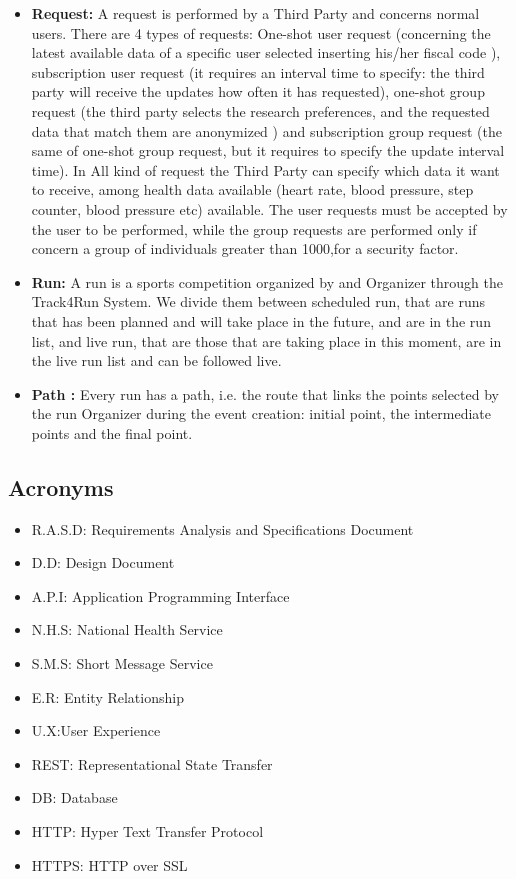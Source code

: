 \begin{itemize}
\item\textbf{Request:} A request is performed by a Third Party and concerns normal users. There are 4 types of requests: One-shot user request (concerning the latest available data of a specific user selected inserting his/her fiscal code ), subscription user request (it requires an interval time to specify: the third party will receive the updates how often it has requested), one-shot group request (the third party selects the research preferences, and the requested data that match them are anonymized ) and subscription group request (the same of one-shot group request, but it requires to specify the update interval time). In All kind of request the Third Party can specify which data it want to receive, among health data available (heart rate, blood pressure, step counter, blood pressure etc) available. The user requests must be accepted by the user to be performed, while the group requests are performed only if concern a group of individuals greater than 1000,for a security factor.

\item\textbf{Run:} A run is a sports competition organized by and Organizer through  the Track4Run System. We divide them between scheduled run, that are runs that has been planned and will take place in the future, and are in the run list, and live run, that are those that are taking place in this moment, are in the live run list and can be followed live. 
\item\textbf{Path :} Every run has a path, i.e. the route that links the points selected by the run Organizer during the event creation: initial point, the intermediate points and the final point. 



	\end{itemize}
\subsection{Acronyms}

\begin{itemize}
  \item R.A.S.D: Requirements Analysis and Specifications Document
  \item D.D: Design Document
  \item A.P.I: Application Programming Interface 
  \item N.H.S: National Health Service
  \item S.M.S: Short Message Service
  \item E.R: Entity Relationship
  \item U.X:User Experience 
  \item REST: Representational State Transfer
  \item DB: Database
  \item HTTP: Hyper Text Transfer Protocol
  \item HTTPS: HTTP over SSL
\end{itemize}

